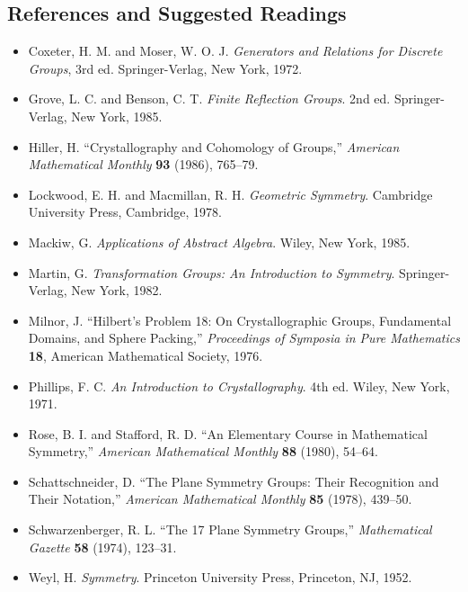  
 
\subsection*{References and Suggested Readings}
 
 
 
{\small
\begin{itemize}
 
\item[{\bf [1]}]
Coxeter, H. M. and Moser, W. O. J. {\it Generators and
Relations for Discrete Groups}, 3rd ed. Springer-Verlag, New
York, 1972.
 
\item[{\bf [2]}]
Grove, L. C. and Benson, C. T. {\it Finite Reflection
Groups}. 2nd ed. Springer-Verlag, New York, 1985.
 
\item[{\bf [3]}]
Hiller, H. ``Crystallography and Cohomology of Groups,''
{\it American Mathematical Monthly} {\bf 93} (1986), 765--79.
 
\item[{\bf [4]}]
Lockwood, E. H. and Macmillan, R. H. {\it Geometric
Symmetry}. Cambridge University Press, Cambridge, 1978.
 
\item[{\bf [5]}]
Mackiw, G. {\it Applications of Abstract Algebra}. Wiley,
New York, 1985.
 
 
\item[{\bf [6]}]
Martin,  G.  {\it Transformation  Groups:  An Introduction to
Symmetry}.  Springer-Verlag, New York, 1982.
 
  
\item[{\bf [7]}]
Milnor, J. ``Hilbert's Problem 18: On Crystallographic
Groups, Fundamental Domains, and Sphere Packing,'' {\it
Proceedings of Symposia in Pure Mathematics} {\bf 18},
American Mathematical Society, 1976.
 
\item[{\bf [8]}]
Phillips, F. C. {\it An Introduction to Crystallography}.
4th ed. Wiley, New York, 1971.
 
\item[{\bf [9]}]
Rose, B. I. and Stafford, R. D. ``An Elementary Course in
Mathematical Symmetry,'' {\it American Mathematical Monthly} {\bf
88} (1980), 54--64.
 
 
\item[{\bf [10]}]
Schattschneider, D. ``The Plane Symmetry Groups: Their
Recognition and Their Notation,'' {\it American Mathematical 
Monthly} {\bf 85} (1978), 439--50.
 
 
\item[{\bf [11]}]
Schwarzenberger, R. L. ``The 17 Plane Symmetry Groups,'' {\it
Mathematical  Gazette} {\bf 58} (1974), 123--31. 
 
 
\item[{\bf [12]}]
Weyl, H. {\it Symmetry}. Princeton University Press, Princeton, NJ,
1952. 
 
 
\end{itemize}
}
 
 
 
 
